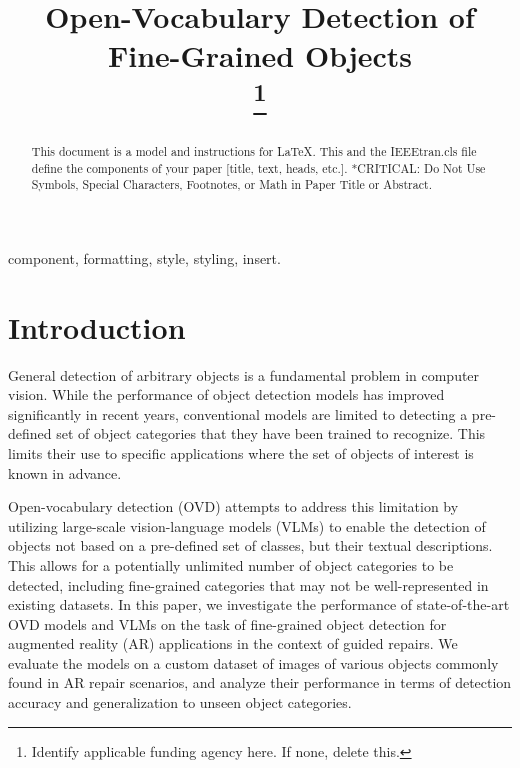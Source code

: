 \documentclass[conference]{IEEEtran}
\begin{document}
\title{Open-Vocabulary Detection of Fine-Grained Objects\\
\thanks{Identify applicable funding agency here. If none, delete this.}
}

\author{
}

\maketitle

\begin{abstract}
This document is a model and instructions for \LaTeX.
This and the IEEEtran.cls file define the components of your paper [title, text, heads, etc.]. *CRITICAL: Do Not Use Symbols, Special Characters, Footnotes, 
or Math in Paper Title or Abstract.
\end{abstract}

\begin{IEEEkeywords}
component, formatting, style, styling, insert.
\end{IEEEkeywords}

\section{Introduction}
General detection of arbitrary objects is a fundamental problem in computer vision. While the performance of object detection models has improved significantly in recent years, conventional models are limited to detecting a pre-defined set of object categories that they have been trained to recognize. This limits their use to specific applications where the set of objects of interest is known in advance. \cite{liu2019} \cite{Edozie2025}

Open-vocabulary detection (OVD) attempts to address this limitation by utilizing large-scale vision-language models (VLMs) to enable the detection of objects not based on a pre-defined set of classes, but their textual descriptions. This allows for a potentially unlimited number of object categories to be detected, including fine-grained categories that may not be well-represented in existing datasets. In this paper, we investigate the performance of state-of-the-art OVD models and VLMs on the task of fine-grained object detection for augmented reality (AR) applications in the context of guided repairs. We evaluate the models on a custom dataset of images of various objects commonly found in AR repair scenarios, and analyze their performance in terms of detection accuracy and generalization to unseen object categories.
\end{document}
